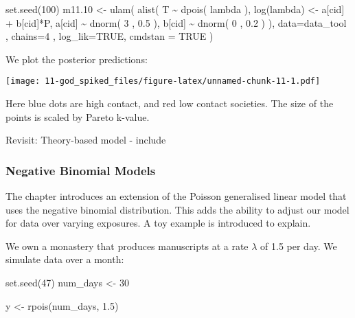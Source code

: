 \documentclass[
]{book}
\newenvironment{Shaded}{\begin{snugshade}}{\end{snugshade}}
\newcommand{\AttributeTok}[1]{\textcolor[rgb]{0.77,0.63,0.00}{#1}}
\newcommand{\ConstantTok}[1]{\textcolor[rgb]{0.00,0.00,0.00}{#1}}
\newcommand{\DecValTok}[1]{\textcolor[rgb]{0.00,0.00,0.81}{#1}}
\newcommand{\FloatTok}[1]{\textcolor[rgb]{0.00,0.00,0.81}{#1}}
\newcommand{\FunctionTok}[1]{\textcolor[rgb]{0.00,0.00,0.00}{#1}}
\newcommand{\NormalTok}[1]{#1}
\newcommand{\OtherTok}[1]{\textcolor[rgb]{0.56,0.35,0.01}{#1}}
\newcommand{\SpecialCharTok}[1]{\textcolor[rgb]{0.00,0.00,0.00}{#1}}
\begin{document}
\begin{Shaded}
\begin{Highlighting}[]
\FunctionTok{set.seed}\NormalTok{(}\DecValTok{100}\NormalTok{)}
\NormalTok{m11}\FloatTok{.10} \OtherTok{\textless{}{-}} \FunctionTok{ulam}\NormalTok{( }\FunctionTok{alist}\NormalTok{( }
\NormalTok{  T }\SpecialCharTok{\textasciitilde{}} \FunctionTok{dpois}\NormalTok{( lambda ), }
  \FunctionTok{log}\NormalTok{(lambda) }\OtherTok{\textless{}{-}}\NormalTok{ a[cid] }\SpecialCharTok{+}\NormalTok{ b[cid]}\SpecialCharTok{*}\NormalTok{P, }
\NormalTok{  a[cid] }\SpecialCharTok{\textasciitilde{}} \FunctionTok{dnorm}\NormalTok{( }\DecValTok{3}\NormalTok{ , }\FloatTok{0.5}\NormalTok{ ), }
\NormalTok{  b[cid] }\SpecialCharTok{\textasciitilde{}} \FunctionTok{dnorm}\NormalTok{( }\DecValTok{0}\NormalTok{ , }\FloatTok{0.2}\NormalTok{ )}
\NormalTok{), }\AttributeTok{data=}\NormalTok{data\_tool , }\AttributeTok{chains=}\DecValTok{4}\NormalTok{ , }\AttributeTok{log\_lik=}\ConstantTok{TRUE}\NormalTok{, }\AttributeTok{cmdstan =} \ConstantTok{TRUE}\NormalTok{ )}
\end{Highlighting}
\end{Shaded}

We plot the posterior predictions:

\texttt{[image: 11-god\_spiked\_files/figure-latex/unnamed-chunk-11-1.pdf]}

Here blue dots are high contact, and red low contact societies. The size of the points is scaled by Pareto k-value.

Revisit: Theory-based model - include

\hypertarget{negative-binomial-models}{%
\subsubsection*{Negative Binomial Models}\label{negative-binomial-models}}

The chapter introduces an extension of the Poisson generalised linear model that uses the negative binomial distribution. This adds the ability to adjust our model for data over varying exposures. A toy example is introduced to explain.

We own a monastery that produces manuscripts at a rate \(\lambda\) of 1.5 per day. We simulate data over a month:

\begin{Shaded}
\begin{Highlighting}[]
\FunctionTok{set.seed}\NormalTok{(}\DecValTok{47}\NormalTok{)}
\NormalTok{num\_days }\OtherTok{\textless{}{-}} \DecValTok{30}

\NormalTok{y }\OtherTok{\textless{}{-}} \FunctionTok{rpois}\NormalTok{(num\_days, }\FloatTok{1.5}\NormalTok{)}
\end{Highlighting}
\end{Shaded}
\end{document}
